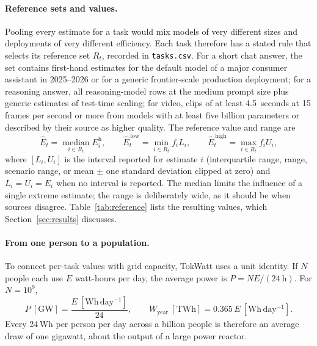 \documentclass[11pt]{article}
\newcommand{\file}[1]{\texttt{#1}}
\newcommand{\Wh}{\,Wh}
\begin{document}
\paragraph{Reference sets and values.}
Pooling every estimate for a task would mix models of very different sizes and deployments of very different efficiency. Each task therefore has a stated rule that selects its reference set $R_t$, recorded in \file{tasks.csv}. For a short chat answer, the set contains first-hand estimates for the default model of a major consumer assistant in 2025--2026 or for a generic frontier-scale production deployment; for a reasoning answer, all reasoning-model rows at the medium prompt size plus generic estimates of test-time scaling; for video, clips of at least 4.5~seconds at 15 frames per second or more from models with at least five billion parameters or described by their source as higher quality. The reference value and range are
\begin{equation}
  \hat{E}_t = \operatorname*{median}_{i \in R_t} E^{\mathrm{h}}_i, \qquad
  \hat{E}^{\,\mathrm{low}}_t = \min_{i \in R_t} f_i L_i, \qquad
  \hat{E}^{\,\mathrm{high}}_t = \max_{i \in R_t} f_i U_i,
  \label{eq:reference}
\end{equation}
where $[L_i, U_i]$ is the interval reported for estimate $i$ (interquartile range, range, scenario range, or mean $\pm$ one standard deviation clipped at zero) and $L_i = U_i = E_i$ when no interval is reported. The median limits the influence of a single extreme estimate; the range is deliberately wide, as it should be when sources disagree. Table~\ref{tab:reference} lists the resulting values, which Section~\ref{sec:results} discusses.

\begin{table}[t]
  \centering
  \footnotesize
  \caption{Reference values per task, ordered by energy. Reference: median of the harmonized reference set; range: widest harmonized interval reported in the set (``--'' when no interval is reported); all-rows median: median of every harmonized estimate for the task. $^{\dagger}$Single source.}
  \label{tab:reference}
  
\end{table}

\paragraph{From one person to a population.}
To connect per-task values with grid capacity, TokWatt uses a unit identity. If $N$ people each use $E$ watt-hours per day, the average power is $P = NE/(24~\mathrm{h})$. For $N = 10^{9}$,
\begin{equation}
  P~[\mathrm{GW}] = \frac{E~[\mathrm{Wh\,day^{-1}}]}{24}, \qquad
  W_{\mathrm{year}}~[\mathrm{TWh}] = 0.365\,E~[\mathrm{Wh\,day^{-1}}].
  \label{eq:billion}
\end{equation}
Every 24\Wh{} per person per day across a billion people is therefore an average draw of one gigawatt, about the output of a large power reactor.
\end{document}
